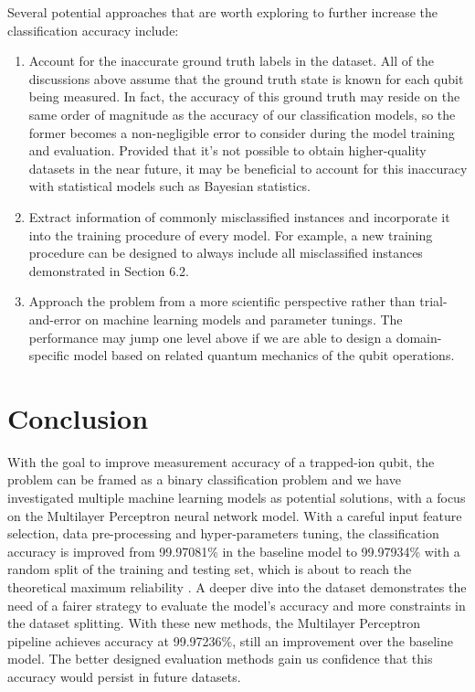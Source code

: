 \documentclass[letterpaper,twocolumn,10pt]{article}
\begin{document}
Several potential approaches that are worth exploring to further increase the classification accuracy include:

\begin{enumerate}
    \item 
    Account for the inaccurate ground truth labels in the dataset. All of the discussions above assume that the ground truth state is known for each qubit being measured. In fact, the accuracy of this ground truth may reside on the same order of magnitude as the accuracy of our classification models, so the former becomes a non-negligible error to consider during the model training and evaluation. Provided that it's not possible to obtain higher-quality datasets in the near future, it may be beneficial to account for this inaccuracy with statistical models such as Bayesian statistics. 

    \item 
    Extract information of commonly misclassified instances and incorporate it into the training procedure of every model. For example, a new training procedure can be designed to always include all misclassified instances demonstrated in Section 6.2.

    \item 
    Approach the problem from a more scientific perspective rather than trial-and-error on machine learning models and parameter tunings. The performance may jump one level above if we are able to design a domain-specific model based on related quantum mechanics of the qubit operations.

\end{enumerate}

\section{Conclusion}

With the goal to improve measurement accuracy of a trapped-ion qubit, the problem can be framed as a binary classification problem and we have investigated multiple machine learning models as potential solutions, with a focus on the Multilayer Perceptron neural network model. With a careful input feature selection, data pre-processing and hyper-parameters tuning, the classification accuracy is improved from 99.97081\% in the baseline model to 99.97934\% with a random split of the training and testing set, which is about to reach the theoretical maximum reliability . A deeper dive into the dataset demonstrates the need of a fairer strategy to evaluate the model's accuracy and more constraints in the dataset splitting. With these new methods, the Multilayer Perceptron pipeline achieves accuracy at 99.97236\%, still an improvement over the baseline model. The better designed evaluation methods gain us confidence that this accuracy would persist in future datasets.
\end{document}

